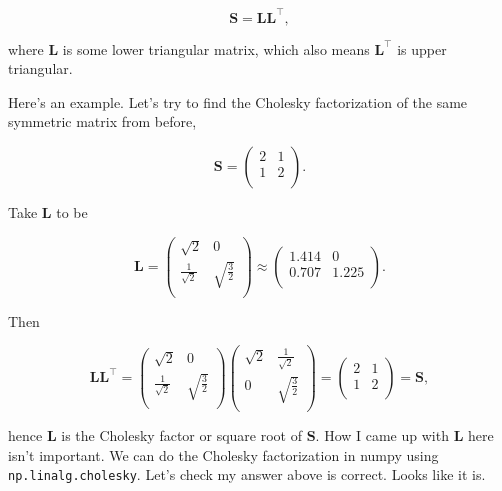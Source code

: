\documentclass[
  letterpaper,
  DIV=11,
  numbers=noendperiod]{scrreprt}
\begin{document}
\[\mathbf{S} = \mathbf{L} \mathbf{L}^\top,\]

where \(\mathbf{L}\) is some lower triangular matrix, which also means
\(\mathbf{L}^\top\) is upper triangular.

Here's an example. Let's try to find the Cholesky factorization of the
same symmetric matrix from before,

\[
\mathbf{S} = 
\begin{pmatrix}
2 & 1 \\
1 & 2 \\
\end{pmatrix}.
\]

Take \(\mathbf{L}\) to be

\[
\mathbf{L} = 
\begin{pmatrix}
\sqrt{2} & 0 \\
\frac{1}{\sqrt{2}} & \sqrt{\frac{3}{2}} \\
\end{pmatrix} \approx
\begin{pmatrix}
1.414 & 0 \\
0.707 & 1.225 \\
\end{pmatrix}.
\]

Then

\[
\mathbf{L}\mathbf{L}^\top = 
\begin{pmatrix}
\sqrt{2} & 0 \\
\frac{1}{\sqrt{2}} & \sqrt{\frac{3}{2}} \\
\end{pmatrix}
\begin{pmatrix}
\sqrt{2} & \frac{1}{\sqrt{2}} \\
0 & \sqrt{\frac{3}{2}} \\
\end{pmatrix} = 
\begin{pmatrix}
2 & 1 \\
1 & 2 \\
\end{pmatrix} = 
\mathbf{S},
\]

hence \(\mathbf{L}\) is the Cholesky factor or square root of
\(\mathbf{S}\). How I came up with \(\mathbf{L}\) here isn't important.
We can do the Cholesky factorization in numpy using
\texttt{np.linalg.cholesky}. Let's check my answer above is correct.
Looks like it is.
\end{document}
